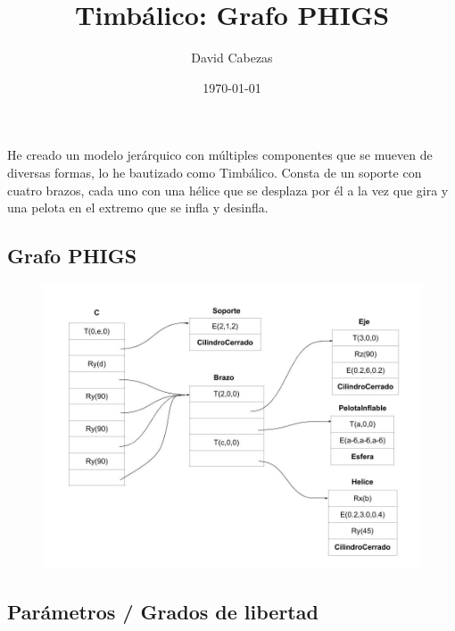 \documentclass[12pt]{article}
\begin{document}
\title{Timbálico: Grafo PHIGS}
\author{David Cabezas}
\date{\today}
\maketitle

He creado un modelo jerárquico con múltiples componentes que se mueven
de diversas formas, lo he bautizado como Timbálico. Consta de un
soporte con cuatro brazos, cada uno con una hélice que se desplaza por él
a la vez que gira y una pelota en el extremo que se infla y desinfla.

\subsection*{Grafo PHIGS}
\vspace{-5mm}

\begin{figure}[H]
 \hspace{-30mm} \includegraphics[width=200mm]{PHIGS-timbalico}
\end{figure}

\subsection*{Parámetros / Grados de libertad}
\end{document}
